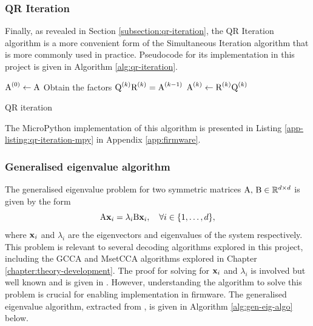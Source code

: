 \subsubsection{QR Iteration}
Finally, as revealed in Section \ref{subsection:qr-iteration}, the QR Iteration algorithm is a more convenient form of the Simultaneous Iteration algorithm that is more commonly used in practice. Pseudocode for its implementation in this project is given in Algorithm \ref{alg:qr-iteration}.
\begin{algorithm}
\begin{algorithmic}
\State ${\textrm{A}}^{(0)} \gets {\textrm{A}}$ 
    \State Obtain the factors ${\textrm{Q}}^{(k)}{\textrm{R}}^{(k)} = {\textrm{A}}^{(k-1)}$ 
    \State ${\textrm{A}}^{(k)} \gets {\textrm{R}}^{(k)}{\textrm{Q}}^{(k)}$ 
\EndFor
\end{algorithmic}
\caption{QR iteration}
\label{alg:qr-iteration}
\end{algorithm}
The MicroPython implementation of this algorithm is presented in Listing \ref{app-listing:qr-iteration-mpy} in Appendix \ref{app:firmware}.

\subsubsection{Generalised eigenvalue algorithm}
The generalised eigenvalue problem for two symmetric matrices ${\textrm{A}}, \, {\textrm{B}} \in \mathbb{R}^{d \times d}$ is given by the form
\begin{equation}
    {\textrm{A}}{\mathbf{x}}_{i}=\lambda_{i} {\textrm{B}} {\mathbf{x}}_{i}, \quad \forall i \in\{1, \ldots, d\},
    \label{eq:gen-eig-problem}
\end{equation}
where ${\mathbf{x}}_i$ and $\lambda_i$ are the eigenvectors and eigenvalues of the system respectively. This problem is relevant to several decoding algorithms explored in this project, including the GCCA and MsetCCA algorithms explored in Chapter \ref{chapter:theory-development}. The proof for solving for ${\mathbf{x}}_i$ and $\lambda_i$ is involved but well known and is given in \cite{ghojogh-gen-eig-prob}. However, understanding the algorithm to solve this problem is crucial for enabling implementation in firmware. The generalised eigenvalue algorithm, extracted from \cite{ghojogh-gen-eig-prob}, is given in Algorithm \ref{alg:gen-eig-algo} below.

